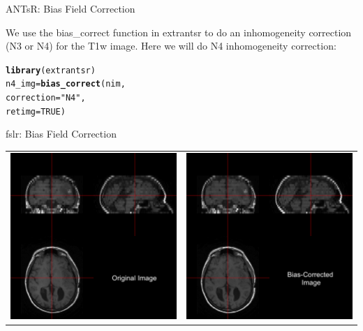 \documentclass[11pt]{beamer}\usepackage[]{graphicx}\usepackage[]{color}
\makeatletter
\newcommand{\hlnum}[1]{\textcolor[rgb]{0.686,0.059,0.569}{#1}}%
\newcommand{\hlstr}[1]{\textcolor[rgb]{0.192,0.494,0.8}{#1}}%
\newcommand{\hlstd}[1]{\textcolor[rgb]{0.345,0.345,0.345}{#1}}%
\newcommand{\hlkwb}[1]{\textcolor[rgb]{0.69,0.353,0.396}{#1}}%
\newcommand{\hlkwc}[1]{\textcolor[rgb]{0.333,0.667,0.333}{#1}}%
\newcommand{\hlkwd}[1]{\textcolor[rgb]{0.737,0.353,0.396}{\textbf{#1}}}%
\newenvironment{kframe}{%
 \def\at@end@of@kframe{}%
 \ifinner\ifhmode%
  \def\at@end@of@kframe{\end{minipage}}%
  \begin{minipage}{\columnwidth}%
 \fi\fi%
 \def\FrameCommand##1{\hskip\@totalleftmargin \hskip-\fboxsep
 \colorbox{shadecolor}{##1}\hskip-\fboxsep
     \hskip-\linewidth \hskip-\@totalleftmargin \hskip\columnwidth}%
 \MakeFramed {\advance\hsize-\width
   \@totalleftmargin\z@ \linewidth\hsize
   \@setminipage}}%
 {\par\unskip\endMakeFramed%
 \at@end@of@kframe}
\newenvironment{knitrout}{}{} %
\makeatother
\begin{document}
\begin{frame}[fragile]{ANTsR: Bias Field Correction}

We use the bias_correct function in extrantsr to do an inhomogeneity correction (N3 or N4) for  the T1w image.  Here we will do N4 inhomogeneity correction:

\begin{knitrout}
\color{fgcolor}\begin{kframe}
\begin{alltt}
\hlkwd{library}\hlstd{(extrantsr)}
\hlstd{n4_img} \hlkwb{=} \hlkwd{bias_correct}\hlstd{(nim,}
                      \hlkwc{correction} \hlstd{=} \hlstr{"N4"}\hlstd{,}
                      \hlkwc{retimg}\hlstd{=}\hlnum{TRUE}\hlstd{)}
\end{alltt}
\end{kframe}
\end{knitrout}
\end{frame}



\begin{frame}[fragile]{fslr: Bias Field Correction}

\begin{tabular}{cc}
\includegraphics[width=0.5\linewidth]{Orig_Image.png} & \includegraphics[width=0.5\linewidth]{FAST_Image.png}
\end{tabular}

\end{frame}
\end{document}
